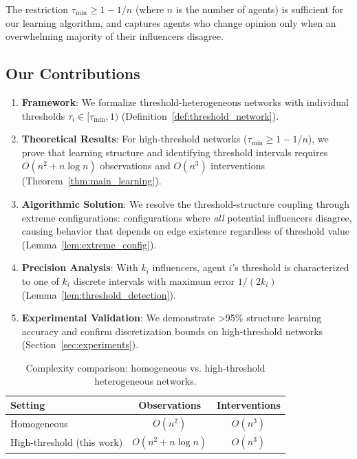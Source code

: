 \documentclass[conference]{IEEEtran}
\begin{document}
The restriction $\tau_{\min} \geq 1 - 1/n$ (where $n$ is the number of agents) is sufficient for our learning algorithm, and captures agents who change opinion only when an overwhelming majority of their influencers disagree.

\subsection{Our Contributions}

\begin{enumerate}
\item \textbf{Framework}: We formalize threshold-heterogeneous networks with individual thresholds $\tau_i \in [\tau_{\min}, 1)$ (Definition~\ref{def:threshold_network}).

\item \textbf{Theoretical Results}: For high-threshold networks ($\tau_{\min} \geq 1 - 1/n$), we prove that learning structure and identifying threshold intervals requires $O(n^2 + n \log n)$ observations and $O(n^3)$ interventions (Theorem~\ref{thm:main_learning}).

\item \textbf{Algorithmic Solution}: We resolve the threshold-structure coupling through extreme configurations: configurations where \emph{all} potential influencers disagree, causing behavior that depends on edge existence regardless of threshold value (Lemma~\ref{lem:extreme_config}).

\item \textbf{Precision Analysis}: With $k_i$ influencers, agent $i$'s threshold is characterized to one of $k_i$ discrete intervals with maximum error $1/(2k_i)$ (Lemma~\ref{lem:threshold_detection}).

\item \textbf{Experimental Validation}: We demonstrate >95\% structure learning accuracy and confirm discretization bounds on high-threshold networks (Section~\ref{sec:experiments}).
\end{enumerate}

\begin{table}[t]
\centering
\caption{Complexity comparison: homogeneous vs. high-threshold heterogeneous networks.}
\label{tab:complexity}
\begin{tabular}{|l|c|c|}
\hline
\textbf{Setting} & \textbf{Observations} & \textbf{Interventions} \\
\hline
Homogeneous \cite{chistikov2020convergence} & $O(n^2)$ & $O(n^3)$ \\
\hline
High-threshold (this work) & $O(n^2 + n \log n)$ & $O(n^3)$ \\
\hline
\end{tabular}
\end{table}
\end{document}
